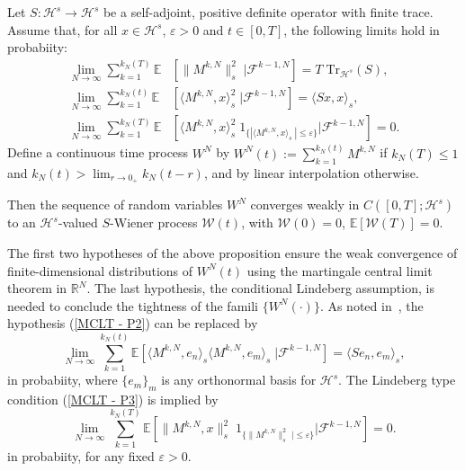 \begin{prop}\autocite[Theorem 5.1]{Berger1986}
\label{Martingale central limit theorem - Helping proposition}
  Let $ S : \mathcal{H}^s \to \mathcal{H}^s $ be a self-adjoint, positive definite operator with finite trace. Assume that, for all $ x \in \mathcal{H}^s $, $ \varepsilon > 0 $ and $ t \in [0,T] $, the following limits hold in probabiity:
  \begin{align}
   \lim_{N \to \infty} \sum_{k=1}^{k_{N}(T)} \mathbb{E} &\left[ \| M^{k,N} \|_{s}^{2}  \; | \mathcal{F}^{k-1,N} \right] = T \; \text{Tr}_{\mathcal{H}^s}(S), \label{MCLT - P1}\\
   \lim_{N \to \infty} \sum_{k=1}^{k_{N}(t)} \mathbb{E} &\left[ \langle  M^{k,N} , x \rangle_{s}^{2}  \; | \mathcal{F}^{k-1,N} \right] = \langle Sx , x \rangle_{s}, \label{MCLT - P2}\\
   \lim_{N \to \infty} \sum_{k=1}^{k_{N}(T)} \mathbb{E} &\left[ \langle M^{k,N} , x \rangle_{s}^{2} \; 1_{\{ | \langle M^{k,N} , x \rangle_s \; | \leq \varepsilon \}} | \mathcal{F}^{k-1,N} \right] = 0. \label{MCLT - P3}
  \end{align}
  Define a continuous time process $ W^{N} $ by $ W^{N}(t) := \sum_{k=1}^{k_{N}(t)} M^{k,N} $ if $ k_{N}(T) \leq 1 $ and $ k_{N}(t) > \lim_{r \to 0_+} k_N(t-r) $, and by linear interpolation otherwise.
  
  Then the sequence of random variables $ W^N $ converges weakly in $ C \left( [0,T]; \mathcal{H}^s \right) $ to an $ \mathcal{H}^s $-valued $S$-Wiener process $\mathcal{W}(t)$, with $ \mathcal{W}(0) = 0 $, $ \mathbb{E} [ \mathcal{W}(T) ] =  0 $.
  
\end{prop}

\begin{rem}
The first two hypotheses of the above proposition ensure the weak convergence of finite-dimensional distributions of $ W^{N}(t) $ using the martingale central limit theorem in $ \mathbb{R}^N $. The last hypothesis, the conditional Lindeberg assumption, is needed to conclude the tightness of the famili $ \{ W^{N}(\cdot) \}  $. As noted in~\autocite{ChenWhite1998}, the hypothesis (\ref{MCLT - P2}) can be replaced by
 \begin{equation}
  \lim_{N \to \infty} \sum_{k=1}^{k_{N}(t)} \mathbb{E} \left[ \langle  M^{k,N} , e_n \rangle_{s} \langle  M^{k,N} , e_m \rangle_{s} \; | \mathcal{F}^{k-1,N} \right] = \langle Se_n , e_m \rangle_{s}, \label{MCLT - P2 - new}
 \end{equation}
 in probabiity, where $ \{ e_m \}_{m} $ is any orthonormal basis for $ \mathcal{H}^s $. The Lindeberg type condition (\ref{MCLT - P3}) is implied by
 \begin{equation}
  \lim_{N \to \infty} \sum_{k=1}^{k_{N}(T)} \mathbb{E} \left[ \| M^{k,N} , x \|_{s}^{2} \;  1_{\{ \| M^{k,N} \|_{s}^{2} \; | \leq \varepsilon \}} | \mathcal{F}^{k-1,N} \right] = 0. \label{MCLT - P3 - new}
 \end{equation}
 in probabiity, for any fixed $ \varepsilon > 0 $.

\end{rem}

